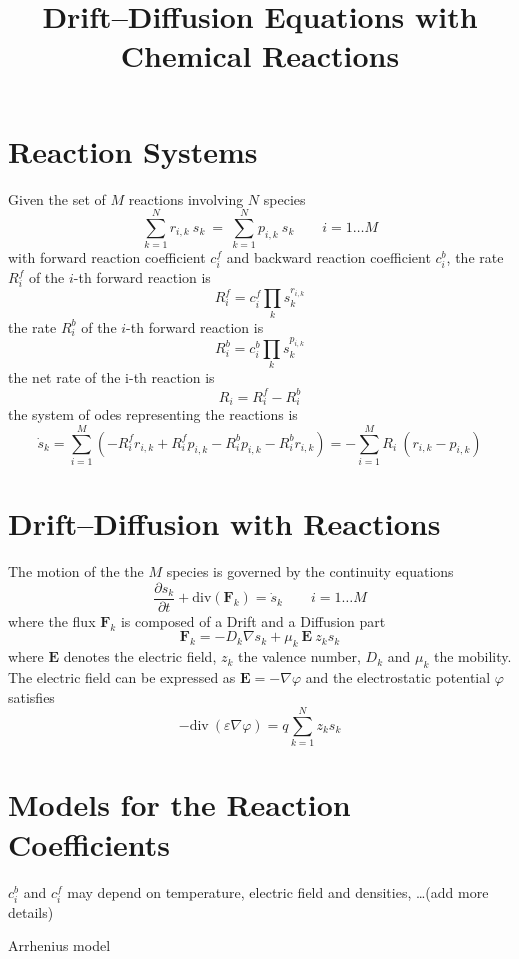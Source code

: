 \documentclass[11pt]{amsart}
\title{Drift--Diffusion Equations with Chemical Reactions}
\author{}
\begin{document}
\maketitle

\section{Reaction Systems}

Given the set of $M$ reactions involving $N$ species
\[
\sum_{k=1}^{N} r_{i,k}\ s_k\ =\ \sum_{k=1}^{N} p_{i,k}\ s_k \qquad  i=1\ldots M
\]
with forward reaction coefficient $c^f_i$ and backward reaction coefficient $c^b_i$,
the rate $R^{f}_i$ of the $i$-th forward reaction is 
$$
 R^{f}_i = c^{f}_i \prod_k s_k^{ r_{i,k} }
$$
the rate $R^{b}_i$ of the $i$-th forward reaction is 
$$
 R^{b}_i = c^{b}_i \prod_k s_k^{ p_{i,k} }
$$
the net rate of the i-th reaction is 
$$
R_i = R^{f}_i - R^{b}_i
$$
the system of odes representing the reactions is
$$
\dot{s}_k = \sum_{i=1}^M \left( - R^{f}_i r_{i,k} + R^{f}_i p_{i,k}
             - R^{b}_i p_{i,k} - R^{b}_i r_{i,k} \right) =
             - \sum_{i=1}^M  R_i\ (r_{i,k} - p_{i,k}) 
$$

\section{Drift--Diffusion with Reactions}

The motion of the the $M$ species is governed by the continuity equations
$$
\dfrac{\partial s_{k}}{\partial t} + \mathrm{div} \left( \mathbf{F}_{k} \right) = \dot{s}_k  \qquad  i=1\ldots M
$$
where the flux $\mathbf{F}_{k}$ is composed of a Drift and a Diffusion part
$$
\mathbf{F}_{k} = - D_{k} \nabla s_{k} + \mu_{k}\ \mathbf{E}\ z_{k} s_{k}
$$
where $\mathbf{E}$ denotes the electric field, $z_{k}$ the valence number, $D_{k}$ and $\mu_{k}$ the mobility.
The electric field can be expressed as $\mathbf{E} = - \nabla \varphi$ and the electrostatic potential $\varphi$ 
satisfies
$$
-\mathrm{div}\ \left( \varepsilon \nabla \varphi \right) = q \sum_{k=1}^{N} z_{k} s_{k}
$$

\section{Models for the Reaction Coefficients}

$c^{b}_i$ and $c^{f}_i$ may depend on temperature, electric field and densities, \dots(add more details) 

Arrhenius model
\end{document}
